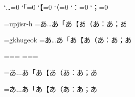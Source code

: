 \prebreakpenalty`…=0
\postbreakpenalty`「=0
\postbreakpenalty`【=0
\postbreakpenalty`（=0
\postbreakpenalty`：=0
\postbreakpenalty`；=0


\font\x=upjisr-h\x
{}=\hbox{あ…あ「あ【あ（あ：あ；あ}

\font\y=gkhugeok\y
{}=\hbox{あ…あ「あ【あ（あ：あ；あ}

\newfam\mx
\newfam\my
\textfont\mx=\x \scriptfont\mx=\x \scriptscriptfont\mx=\x
\textfont\my=\y \scriptfont\my=\y \scriptscriptfont\my=\y

\jfam\mx
{}=\hbox{$あ…あ「あ【あ（あ：あ；あ$}

\jfam\my
{}=\hbox{$あ…あ「あ【あ（あ：あ；あ$}

\bye
